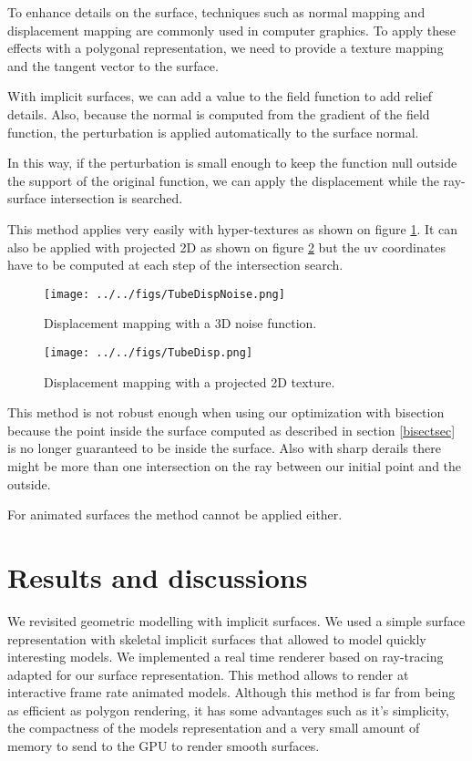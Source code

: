 \documentclass[annual]{acmsiggraph}
\begin{document}
To enhance details on the surface, techniques such as normal mapping and displacement mapping are commonly used in computer graphics.
To apply these effects with a polygonal representation, we need to provide a texture mapping and the tangent vector to the surface.

With implicit surfaces, we can add a value to the field function to add relief details.
Also, because the normal is computed from the gradient of the field function, the perturbation is applied automatically to the surface normal.

In this way, if the perturbation is small enough to keep the function null outside the support of the original function, we can apply the displacement while the ray-surface intersection is searched.

This method applies very easily with hyper-textures as shown on figure \ref{hyperdisp}.
It can also be applied with projected 2D  as shown on figure \ref{disp} but the uv coordinates have to be computed at each step of the intersection search.

\begin{figure}[ht]
  \centering
  \texttt{[image: ../../figs/TubeDispNoise.png]}
  \caption{Displacement mapping with a 3D noise function.}
  \label{hyperdisp}
\end{figure}

\begin{figure}[ht]
  \centering
  \texttt{[image: ../../figs/TubeDisp.png]}
  \caption{Displacement mapping with a projected 2D texture.}
  \label{disp}
\end{figure}

This method is not robust enough when using our optimization with bisection because the point inside the surface computed as described in section \ref{bisectsec} is no longer guaranteed to be inside the surface. Also with sharp derails there might be more than one intersection on the ray between our initial point and the outside.

For animated surfaces the method cannot be applied either.


\section{Results and discussions}


We revisited geometric modelling with implicit surfaces. We used a simple surface representation with skeletal implicit surfaces that allowed to model quickly interesting models.
We implemented a real time renderer based on ray-tracing adapted for our surface representation. This method allows to render at interactive frame rate animated models. Although this method is far from being as efficient as polygon rendering, it has some advantages such as it's simplicity, the compactness of the models representation and a very small amount of memory to send to the GPU to render smooth surfaces.
\end{document}
